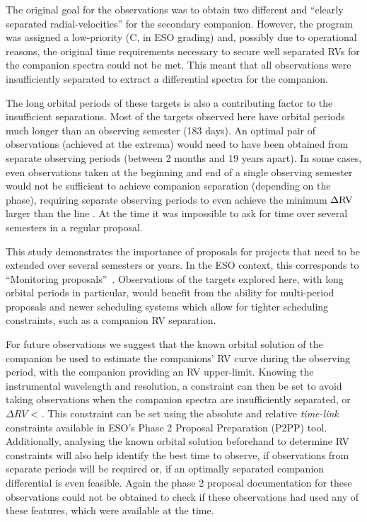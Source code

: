 The original goal for the observations was to obtain two different and ``clearly separated radial-velocities'' for the secondary companion.
However, the program was assigned a low-priority (C, in ESO grading) and, possibly due to operational reasons, the original time requirements necessary to secure well separated RVs for the companion spectra could not be met.
This meant that all observations were insufficiently separated to extract a differential spectra for the companion.

The long orbital periods of these targets is also a contributing factor to the insufficient separations.
Most of the targets observed here have orbital periods much longer than an observing semester (183 days).
An optimal pair of observations (achieved at the extrema) would need to have been obtained from separate observing periods (between 2 months and 19 years apart).
In some cases, even observations taken at the beginning and end of a single observing semester would not be sufficient to achieve companion separation (depending on the phase), requiring separate observing periods to even achieve the minimum \(\Delta \rm {RV}\) larger than the line {\fwhm}.
At the time it was impossible to ask for time over several semesters in a regular proposal.

This study demonstrates the importance of proposals for projects that need to be extended over several semesters or years.
In the ESO context, this corresponds to ``Monitoring proposals''~\citep[e.g.][pg.~18]{eso_eso_2017}.
Observations of the targets explored here, with long orbital periods in particular, would benefit from the ability for multi-period proposals and newer scheduling systems which allow for tighter scheduling constraints, such as a companion {RV} separation.

For future observations we suggest that the known orbital solution of the companion be used to estimate the companions' {RV} curve during the observing period, with the companion \Mtwosini{} providing an {RV} upper-limit.
Knowing the instrumental wavelength and resolution, a constraint can then be set to avoid taking observations when the companion spectra are insufficiently separated, or \(\Delta {RV}\) < {\fwhm}.
This constraint can be set using the absolute and relative \emph{time-link} constraints available in {ESO}'s {Phase 2 Proposal Preparation} (P2PP) tool.
Additionally, analysing the known orbital solution beforehand to determine {RV} constraints will also help identify the best time to observe, if observations from separate periods will be required or, if an optimally separated companion differential is even feasible.
Again the phase 2 proposal documentation for these observations could not be obtained to check if these observations had used any of these features, which were available at the time.





